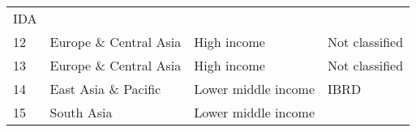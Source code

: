 \documentclass[
]{article}
\begin{document}
\begin{longtable}[]{@{}llll@{}}
\begin{minipage}[t]{0.16\columnwidth}
IDA\strut
\end{minipage}\tabularnewline
\begin{minipage}[t]{0.06\columnwidth}\raggedright
12\strut
\end{minipage} & \begin{minipage}[t]{0.17\columnwidth}\raggedright
Europe \& Central Asia\strut
\end{minipage} & \begin{minipage}[t]{0.11\columnwidth}\raggedright
High income\strut
\end{minipage} & \begin{minipage}[t]{0.16\columnwidth}\raggedright
Not classified\strut
\end{minipage}\tabularnewline
\begin{minipage}[t]{0.06\columnwidth}\raggedright
13\strut
\end{minipage} & \begin{minipage}[t]{0.17\columnwidth}\raggedright
Europe \& Central Asia\strut
\end{minipage} & \begin{minipage}[t]{0.11\columnwidth}\raggedright
High income\strut
\end{minipage} & \begin{minipage}[t]{0.16\columnwidth}\raggedright
Not classified\strut
\end{minipage}\tabularnewline
\begin{minipage}[t]{0.06\columnwidth}\raggedright
14\strut
\end{minipage} & \begin{minipage}[t]{0.17\columnwidth}\raggedright
East Asia \& Pacific\strut
\end{minipage} & \begin{minipage}[t]{0.11\columnwidth}\raggedright
Lower middle income\strut
\end{minipage} & \begin{minipage}[t]{0.16\columnwidth}\raggedright
IBRD\strut
\end{minipage}\tabularnewline
\begin{minipage}[t]{0.06\columnwidth}\raggedright
15\strut
\end{minipage} & \begin{minipage}[t]{0.17\columnwidth}\raggedright
South Asia\strut
\end{minipage} & \begin{minipage}[t]{0.11\columnwidth}\raggedright
Lower middle income\strut
\end{minipage} & \begin{minipage}[t]{0.16\columnwidth}\raggedright

\end{minipage}
\end{longtable}
\end{document}
